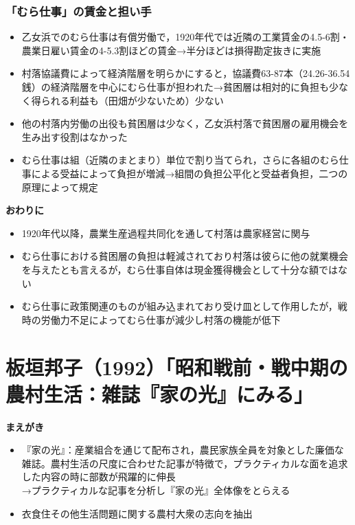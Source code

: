 \documentclass[11pt,autodetect-engine]{jsarticle}%
\begin{document}
\section{「むら仕事」の賃金と担い手}
 \begin{itemize}
  \item 乙女浜でのむら仕事は有償労働で，1920年代では近隣の工業賃金の4.5-6割・農業日雇い賃金の4-5.3割ほどの賃金→半分ほどは損得勘定抜きに実施
  \item 村落協議費によって経済階層を明らかにすると，協議費63-87本（24.26-36.54銭）の経済階層を中心にむら仕事が担われた→貧困層は相対的に負担も少なく得られる利益も（田畑が少ないため）少ない
  \item 他の村落内労働の出役も貧困層は少なく，乙女浜村落で貧困層の雇用機会を生み出す役割はなかった
  \item むら仕事は組（近隣のまとまり）単位で割り当てられ，さらに各組のむら仕事による受益によって負担が増減→組間の負担公平化と受益者負担，二つの原理によって規定
\end{itemize}

{\bf 
\Large おわりに}
\large\begin{itemize}
  \item 1920年代以降，農業生産過程共同化を通して村落は農家経営に関与
  \item むら仕事における貧困層の負担は軽減されており村落は彼らに他の就業機会を与えたとも言えるが，むら仕事自体は現金獲得機会として十分な額ではない
  \item むら仕事に政策関連のものが組み込まれており受け皿として作用したが，戦時の労働力不足によってむら仕事が減少し村落の機能が低下
\end{itemize}

\part{板垣邦子（1992）「昭和戦前・戦中期の農村生活：雑誌『家の光』にみる」}
\setcounter{section}{0}

{\bf 
\Large まえがき}
\large\begin{itemize}
  \item 『家の光』：産業組合を通じて配布され，農民家族全員を対象とした廉価な雑誌。農村生活の尺度に合わせた記事が特徴で，プラクティカルな面を追求した内容の時に部数が飛躍的に伸長
  \\→プラクティカルな記事を分析し『家の光』全体像をとらえる
  \item 衣食住その他生活問題に関する農村大衆の志向を抽出
\end{itemize}
\end{document}
